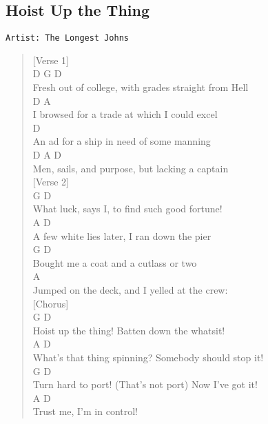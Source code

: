 \documentclass[11pt]{article}
\begin{document}
\subsection{Hoist Up the Thing}
\label{sec:org1111dce}
\begin{verbatim}
Artist: The Longest Johns
\end{verbatim}
\begin{verse}
[Verse 1]\\
D                           G                   D\\
Fresh out of college, with grades straight from Hell\\
\hspace*{2em}D                            A\\
I browsed for a trade at which I could excel\\
D\\
An ad for a ship in need of some manning\\
D                            A         D\\
Men, sails, and purpose, but lacking a captain\\
\vspace*{1em}
[Verse 2]\\
G                     D\\
What luck, says I, to find such good fortune!\\
\hspace*{2em}A                       D\\
A few white lies later, I ran down the pier\\
G                      D\\
Bought me a coat and a cutlass or two\\
A\\
Jumped on the deck, and I yelled at the crew:\\
\vspace*{1em}
[Chorus]\\
G                   D\\
Hoist up the thing! Batten down the whatsit!\\
A                           D\\
What's that thing spinning? Somebody should stop it!\\
G                                    D\\
Turn hard to port! (That's not port) Now I've got it!\\
A                    D\\
Trust me, I'm in control!\\

\end{verse}
\end{document}
